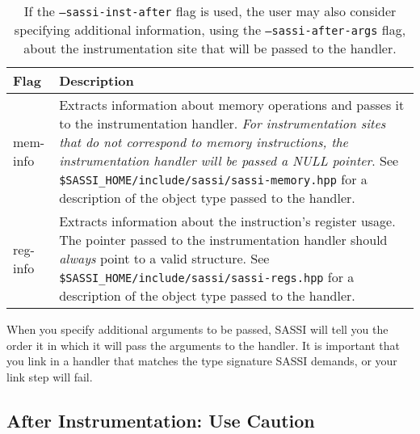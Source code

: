 \begin{table}
\center
\begin{tabular}{|l|L{3.4in}|}
\hline Flag & Description \\ \hline 
mem-info &
Extracts information about memory operations and passes it to the
instrumentation handler.  \emph{For instrumentation sites that do not
  correspond to memory instructions, the instrumentation handler will
  be passed a NULL pointer}.  See
\texttt{\$SASSI\_HOME/include/sassi/sassi-memory.hpp} for a description
of the object type passed to the handler. \\ \hline reg-info &
Extracts information about the instruction's register usage.  The
pointer passed to the instrumentation handler should \emph{always}
point to a valid structure.  See
\texttt{\$SASSI\_HOME/include/sassi/sassi-regs.hpp} for a description of
the object type passed to the handler. \\ \hline
\end{tabular}
\caption{If the \texttt{--sassi-inst-after} flag is used, the
  user may also consider specifying additional information, using the
  \texttt{--sassi-after-args} flag, about the instrumentation site
  that will be passed to the handler.}
\label{tab:after-args}
\end{table}

When you specify additional arguments to be passed, SASSI will tell
you the order it in which it will pass the arguments to the handler.
It is important that you link in a handler that matches the type
signature SASSI demands, or your link step will fail.

\subsection{After Instrumentation: Use Caution}
\label{sec:after-pitfalls}

